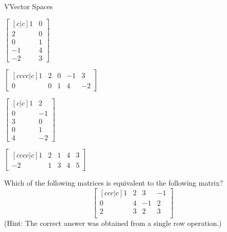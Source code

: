 \documentclass{article}[12pt]
\begin{document}
\begin{module}{V}{Vector Spaces}
\begin{readinessAssuranceTest}
  \begin{multicols}{3}
  \begin{readinessAssuranceTestChoices}
  \item \(
        \begin{bmatrix}[c|c]
          1 & 0 \\
          2 & 0 \\
          0 & 1 \\
          -1 & 4 \\
          -2 & 3
        \end{bmatrix}
      \)
  \item \(
        \begin{bmatrix}[cccc|c]
          1 & 2 & 0 & -1 & 3 \\
          0 & 0 & 1 & 4 & -2
        \end{bmatrix}
      \) %
  \item \(
        \begin{bmatrix}[c|c]
          1 & 2 \\
          0 & -1 \\
          3 & 0 \\
          0 & 1 \\
          4 & -2
        \end{bmatrix}
      \)
  \item \(
        \begin{bmatrix}[cccc|c]
          1 & 2 & 1 & 4 & 3 \\
          -2 & 1 & 3 & 4 & 5
        \end{bmatrix}
      \)
  \end{readinessAssuranceTestChoices}
  \end{multicols}

  \item Which of the following matrices is equivalent to the following matrix?
    \[
      \begin{bmatrix}[ccc|c]
        1 & 2 & 3 & -1 \\
        0 & 4 & -1 & 2 \\
        2 & 3 & 2 & 3 \\
      \end{bmatrix}
    \]
    (Hint: The correct answer was obtained from a single row operation.)


\end{readinessAssuranceTest}
\end{module}
\end{document}
